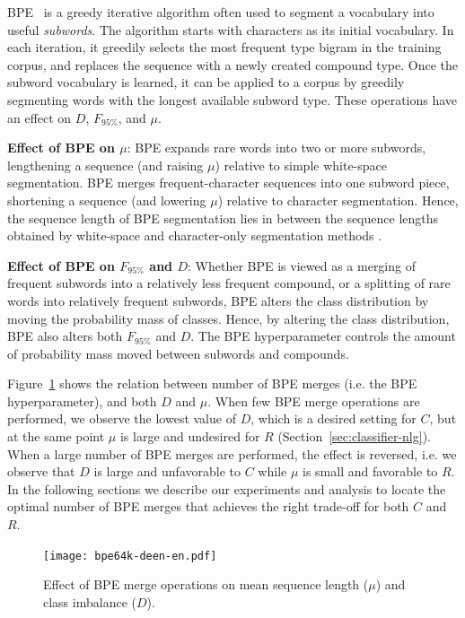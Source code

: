 BPE~\cite{sennrich-etal-2016-bpe} is a greedy iterative algorithm often used to segment a vocabulary into useful \textit{subwords}. 
The algorithm starts with characters as its initial vocabulary.
In each iteration, it greedily selects the most frequent type bigram in the training corpus, and replaces the sequence with a newly created compound type.
Once the subword vocabulary is learned, it can be applied to a corpus by greedily segmenting words with the longest available subword type. These operations have an effect on $D$, $F_{95\%}$, and $\mu$.

\textbf{Effect of BPE on $\mu$}:
BPE expands rare words into two or more subwords, lengthening a sequence (and raising $\mu$) relative to simple white-space segmentation.
BPE merges frequent-character sequences into one subword piece, shortening a sequence (and lowering $\mu$) relative to character segmentation.
Hence, the sequence length of BPE segmentation lies in between the sequence lengths obtained by white-space and character-only segmentation methods \cite{morishita-etal-2018-improving}. 

\textbf{Effect of BPE on $F_{95\%}$ and $D$}:
Whether BPE is viewed as a merging of frequent subwords into a relatively less frequent compound, or a splitting of rare words into relatively frequent subwords, BPE alters the class distribution by moving the probability mass of classes.
Hence, by altering the class distribution, BPE also alters both $F_{95\%}$ and $D$. The BPE hyperparameter controls the amount of probability mass moved between subwords and compounds.

Figure~\ref{fig:BPE-imbalance} shows the relation between number of BPE merges (i.e. the BPE hyperparameter), and both $D$ and $\mu$.
When few BPE merge operations are performed, we observe the lowest value of $D$, which is a desired setting for $C$, but at the same point $\mu$ is large and undesired for $R$ (Section~\ref{sec:classifier-nlg}).
When a large number of BPE merges are performed, the effect is reversed, i.e. we observe that $D$ is large and unfavorable to $C$ while $\mu$ is small and favorable to $R$. 
In the following sections we describe our experiments and analysis to locate the optimal number of BPE merges that achieves the right trade-off for both $C$ and $R$. 

 \begin{figure}[ht]
  \centering
    \texttt{[image: bpe64k-deen-en.pdf]}
    \caption{Effect of BPE merge operations on mean sequence length ($\mu$) and class imbalance ($D$).
    } 
    \label{fig:BPE-imbalance}
\end{figure}


